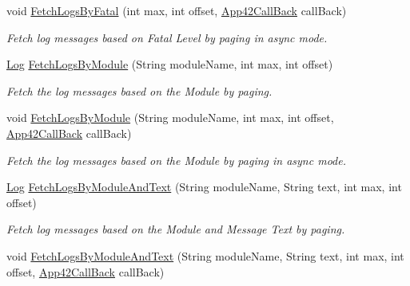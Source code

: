 \begin{DoxyCompactItemize}
void \hyperlink{classcom_1_1shephertz_1_1app42_1_1paas_1_1sdk_1_1csharp_1_1log_1_1_log_service_acf2b60582c8e7fe51484996771f9a82e}{Fetch\+Logs\+By\+Fatal} (int max, int offset, \hyperlink{interfacecom_1_1shephertz_1_1app42_1_1paas_1_1sdk_1_1csharp_1_1_app42_call_back}{App42\+Call\+Back} call\+Back)
\begin{DoxyCompactList}\small\item\em Fetch log messages based on Fatal Level by paging in async mode. \end{DoxyCompactList}\item 
\hyperlink{classcom_1_1shephertz_1_1app42_1_1paas_1_1sdk_1_1csharp_1_1log_1_1_log}{Log} \hyperlink{classcom_1_1shephertz_1_1app42_1_1paas_1_1sdk_1_1csharp_1_1log_1_1_log_service_a72faed311df5c6326e43bd1ee2a58561}{Fetch\+Logs\+By\+Module} (String module\+Name, int max, int offset)
\begin{DoxyCompactList}\small\item\em Fetch the log messages based on the Module by paging. \end{DoxyCompactList}\item 
void \hyperlink{classcom_1_1shephertz_1_1app42_1_1paas_1_1sdk_1_1csharp_1_1log_1_1_log_service_aafe064a8fcb529eca907ce3ec49b94e5}{Fetch\+Logs\+By\+Module} (String module\+Name, int max, int offset, \hyperlink{interfacecom_1_1shephertz_1_1app42_1_1paas_1_1sdk_1_1csharp_1_1_app42_call_back}{App42\+Call\+Back} call\+Back)
\begin{DoxyCompactList}\small\item\em Fetch the log messages based on the Module by paging in async mode. \end{DoxyCompactList}\item 
\hyperlink{classcom_1_1shephertz_1_1app42_1_1paas_1_1sdk_1_1csharp_1_1log_1_1_log}{Log} \hyperlink{classcom_1_1shephertz_1_1app42_1_1paas_1_1sdk_1_1csharp_1_1log_1_1_log_service_aded3871cc031afc0b5eb0b0c5705f2c4}{Fetch\+Logs\+By\+Module\+And\+Text} (String module\+Name, String text, int max, int offset)
\begin{DoxyCompactList}\small\item\em Fetch log messages based on the Module and Message Text by paging. \end{DoxyCompactList}\item 
void \hyperlink{classcom_1_1shephertz_1_1app42_1_1paas_1_1sdk_1_1csharp_1_1log_1_1_log_service_af18f4f42e05e3493b87946b51ff032bf}{Fetch\+Logs\+By\+Module\+And\+Text} (String module\+Name, String text, int max, int offset, \hyperlink{interfacecom_1_1shephertz_1_1app42_1_1paas_1_1sdk_1_1csharp_1_1_app42_call_back}{App42\+Call\+Back} call\+Back)

\end{DoxyCompactItemize}
